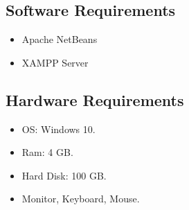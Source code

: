 \subsection{Software Requirements}
\begin{itemize}
    \item Apache NetBeans
\item XAMPP Server
\end{itemize}
\subsection{Hardware Requirements}
\begin{itemize}
    \item OS: Windows 10.
    \item Ram: 4 GB.
    \item Hard Disk: 100 GB.
    \item Monitor, Keyboard, Mouse.
\end{itemize}
